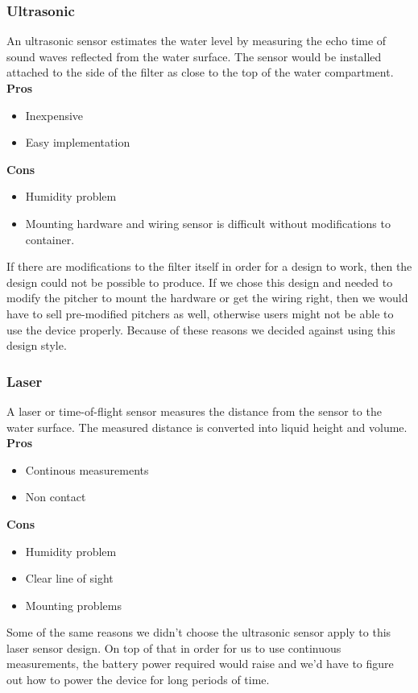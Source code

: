 \subsubsection{Ultrasonic}
An ultrasonic sensor estimates the water level by measuring the echo time of sound waves reflected from the water surface. The sensor would be installed attached to the side of the filter as close to the top of the water compartment. \\
\noindent\textbf{Pros}
    \begin{itemize}
    \item Inexpensive
    \item Easy implementation
    \end{itemize}
\noindent\textbf{Cons}
    \begin{itemize}
    \item Humidity problem
    \item Mounting hardware and wiring sensor is difficult without modifications to container. 
    \end{itemize}
    
If there are modifications to the filter itself in order for a design to work, then the design could not be possible to produce. If we chose this design and needed to modify the pitcher to mount the hardware or get the wiring right, then we would have to sell pre-modified pitchers as well, otherwise users might not be able to use the device properly. Because of these reasons we decided against using this design style. 

\subsubsection{Laser}
A laser or time-of-flight sensor measures the distance from the sensor to the water surface.
The measured distance is converted into liquid height and volume. \\
\noindent\textbf{Pros}
    \begin{itemize}
    \item Continous measurements
    \item Non contact
    \end{itemize}
\noindent\textbf{Cons}
    \begin{itemize}
    \item Humidity problem
    \item Clear line of sight
    \item Mounting problems
    \end{itemize}
    
Some of the same reasons we didn't choose the ultrasonic sensor apply to this laser sensor design. On top of that in order for us to use continuous measurements, the battery power required would raise and we'd have to figure out how to power the device for long periods of time. 
